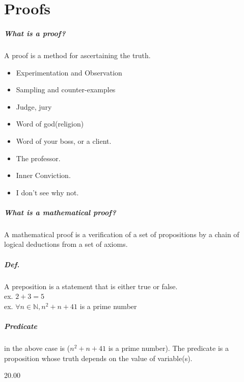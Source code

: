 
\chapter{Proofs}

\paragraph{What is a proof?} A proof is a method for ascertaining the truth.\\
\begin{itemize}
	\item Experimentation and Observation
	\item Sampling and counter-examples
	\item Judge, jury
	\item Word of god(religion)
	\item Word of your boss, or a client.
	\item The professor.
	\item Inner Conviction.
	\item I don't see why not.
\end{itemize}

\paragraph{What is a mathematical proof?} A mathematical proof is a verification of a set of propositions by a chain of logical deductions from a set of axioms.

\paragraph{Def.} A preposition is a statement that is either true or false.\\
ex.  $2+3=5$\\
ex. $\forall n \in \mathbb{N}, n^2+n+41$ is a prime number

\paragraph{Predicate} in the above case is ($n^2+n+41$ is a prime number). The predicate is a proposition whose truth depends on the value of variable(s).

20.00